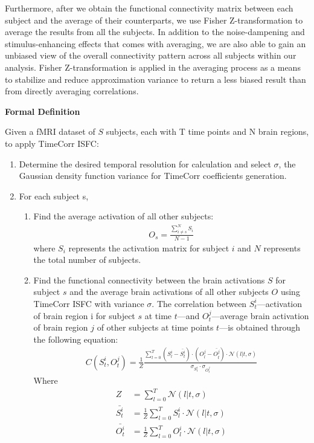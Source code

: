 \documentclass[12pt]{article}
\begin{document}
Furthermore, after we obtain the functional connectivity matrix between each subject and the average of their counterparts, we use Fisher Z-transformation to average the results from all the subjects. In addition to the noise-dampening and stimulus-enhancing effects that comes with averaging, we are also able to gain an unbiased view of the overall connectivity pattern across all subjects within our analysis. Fisher Z-transformation is applied in the averaging process as a means to stabilize and reduce approximation variance to return a less biased result than from directly averaging correlations.

\large{\textbf{Formal Definition}}

\normalsize
Given a fMRI dataset of $S$ subjects, each with T time points and N brain regions, to apply TimeCorr ISFC:
\begin{enumerate}
\item Determine the desired temporal resolution for calculation and select $\sigma$, the Gaussian density function variance for TimeCorr coefficients generation.
\item For each subject s,
\begin{enumerate}
\item Find the average activation of all other subjects:
\begin{align*}
O_s=\frac{\sum_{i\neq s}^N S_i}{N-1}
\end{align*}
where $S_i$ represents the activation matrix for subject $i$ and $N$ represents the total number of subjects.
\item Find the functional connectivity between the brain activations $S$ for subject $s$ and the average brain activations of all other subjects $O$ using TimeCorr ISFC with variance $\sigma$. The correlation between $S^i_t$---activation of brain region i for subject $s$ at time $t$---and $O^j_t$---average brain activation of brain region $j$ of other subjects at time points $t$---is obtained through the following equation:
\begin{align*}
C(S^i_t,O^j_t) = \frac{1}{Z}\frac{\sum_{l=0}^T (S_l^i - \bar{S^i_t})\cdot(O^j_l - \bar{O^j_t})\cdot \mathcal{N}(l|t,\sigma)}{\sigma_{S_t^i} \cdot \sigma_{O_t^j}}
\end{align*}
Where
\begin{align*}
Z &= \sum_{l=0}^T \mathcal{N}(l|t,\sigma)\\
\bar{S^i_t} &=\frac{1}{Z} \sum_{l=0}^T S^i_l \cdot \mathcal{N}(l|t,\sigma)\\
\bar{O^i_t} &=\frac{1}{Z} \sum_{l=0}^T O^i_l \cdot \mathcal{N}(l|t,\sigma)\\

\end{align*}
\end{enumerate}
\end{enumerate}
\end{document}
